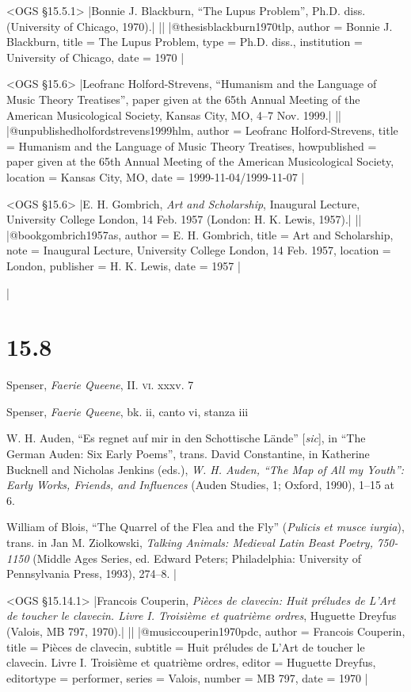 \documentclass[extrafontsizes,11pt,a4paper,oneside]{memoir}
\begin{document}
\bibexample<OGS \S15.5.1>
|Bonnie J. Blackburn, \enquote{The Lupus Problem}, Ph.D. diss. (University of Chicago, 1970).|%
||%
|@thesis{blackburn1970tlp,
  author = {Bonnie J. Blackburn},
  title = {The Lupus Problem},
  type = {Ph.D. diss.},
  institution = {University of Chicago},
  date = {1970}
}|

\bibexample<OGS \S15.6>
|Leofranc Holford-Strevens, \enquote{Humanism and the Language of Music Theory Treatises}, paper given at the 65th Annual Meeting of the American Musicological Society, Kansas City, MO, 4--7 Nov. 1999.|%
||%
|@unpublished{holfordstrevens1999hlm,
  author = {Leofranc Holford-Strevens},
  title = {Humanism and the Language of Music Theory Treatises},
  howpublished = {paper given at the 65th Annual Meeting of the American Musicological Society},
  location = {Kansas City, MO},
  date = {1999-11-04/1999-11-07}
}|

\bibexample<OGS \S15.6>
|E. H. Gombrich, \emph{Art and Scholarship}, Inaugural Lecture, University College London, 14 Feb. 1957 (London: H. K. Lewis, 1957).|%
||%
|@book{gombrich1957as,
  author = {E. H. Gombrich},
  title = {Art and Scholarship},
  note = {Inaugural Lecture, University College London, 14 Feb. 1957},
  location = {London},
  publisher = {H. K. Lewis},
  date = {1957}
}|

\todoc|
\section*{15.8} %

Spenser, \emph{Faerie Queene}, II. \textsc{vi}. xxxv. 7

Spenser, \emph{Faerie Queene}, bk. ii, canto vi, stanza iii

W. H. Auden, \enquote{Es regnet auf mir in den Schottische Lände} [\emph{sic}], in \enquote{The German Auden: Six Early Poems}, trans. David Constantine, in Katherine Bucknell and Nicholas Jenkins (eds.), \emph{W. H. Auden, \enquote{The Map of All my Youth}: Early Works, Friends, and Influences} (Auden Studies, 1; Oxford, 1990), 1--15 at 6.

William of Blois, \enquote{The Quarrel of the Flea and the Fly} (\emph{Pulicis et musce iurgia}), trans. in Jan M. Ziolkowski, \emph{Talking Animals: Medieval Latin Beast Poetry, 750-1150} (Middle Ages Series, ed. Edward Peters; Philadelphia: University of Pennsylvania Press, 1993), 274--8.
|

\bibexample<OGS \S15.14.1>
|Francois Couperin, \emph{Pièces de clavecin: Huit préludes de L'Art de toucher le clavecin. Livre I. Troisième et quatrième ordres}, Huguette Dreyfus (Valois, MB 797, 1970).|%
||%
|@music{couperin1970pdc,
  author = {Francois Couperin},
  title = {Pièces de clavecin},
  subtitle = {Huit préludes de L'Art de toucher le clavecin. Livre I. Troisième et quatrième ordres},
  editor = {Huguette Dreyfus},
  editortype = {performer},
  series = {Valois},
  number = {MB 797},
  date = {1970}
}
|
\end{document}
